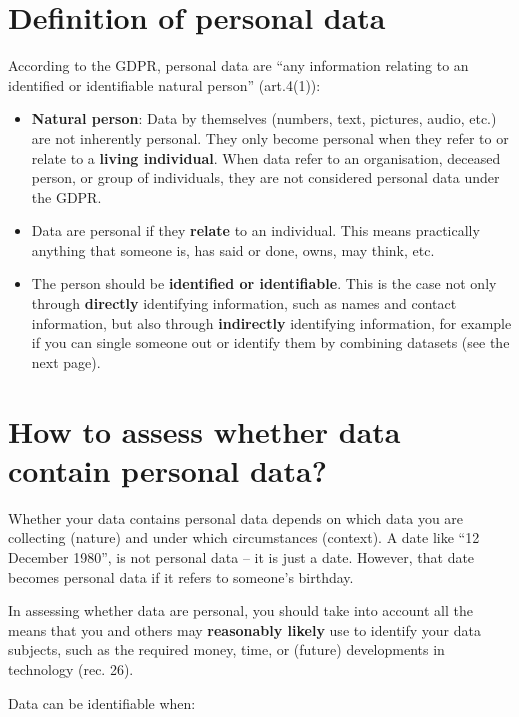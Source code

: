 \documentclass[
]{book}
\providecommand{\tightlist}{%
  \setlength{\itemsep}{0pt}\setlength{\parskip}{0pt}}
\begin{document}
\hypertarget{definition-personal-data}{%
\section{Definition of personal data}\label{definition-personal-data}}

According to the GDPR, personal data are ``any information relating to an
identified or identifiable natural person''
(art.4(1)):

\begin{itemize}
\tightlist
\item
  \textbf{Natural person}: Data by themselves (numbers, text, pictures, audio, etc.)
  are not inherently personal. They only become personal when they refer to or
  relate to a \textbf{living individual}. When data refer to an organisation,
  deceased person, or group of individuals, they are not considered personal data
  under the GDPR.
\item
  Data are personal if they \textbf{relate} to an individual. This means practically
  anything that someone is, has said or done, owns, may think, etc.
\item
  The person should be \textbf{identified or identifiable}. This is the case not
  only through \textbf{directly} identifying information, such as names and contact
  information, but also through \textbf{indirectly} identifying information, for
  example if you can single someone out or identify them by combining datasets
  (see the next page).
\end{itemize}

\hypertarget{personal-data-assess}{%
\section{How to assess whether data contain personal data?}\label{personal-data-assess}}

Whether your data contains personal data depends on which data you are
collecting (nature) and under which circumstances (context). A date like
``12 December 1980'', is not personal data -- it is just a date. However, that
date becomes personal data if it refers to someone's birthday.

In assessing whether data are personal, you should take into account all the
means that you and others may \textbf{reasonably likely} use to identify your data
subjects, such as the required money, time, or (future) developments in
technology (rec. 26).

Data can be identifiable when:
\end{document}
